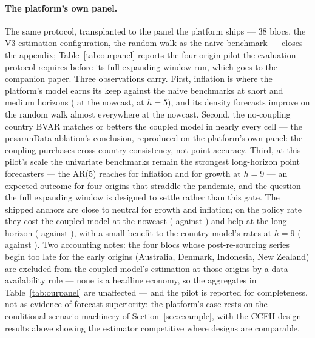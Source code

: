 \paragraph{The platform's own panel.} The same protocol, transplanted to the panel the
platform ships --- 38 blocs, the V3 estimation configuration, the random walk as the
naive benchmark --- closes the appendix; Table~\ref{tab:ourpanel} reports the four-origin
pilot the evaluation protocol requires before its full expanding-window run, which goes
to the companion paper. Three observations carry. First, inflation is where the
platform's model earns its keep against the naive benchmarks at short and medium
horizons (\OpGbvarIHOne{} at the nowcast, \OpGbvarIHFive{} at $h=5$), and its density
forecasts improve on the random walk almost everywhere at the nowcast. Second, the
no-coupling country BVAR matches or betters the coupled model in nearly every cell ---
the pesaranData ablation's conclusion, reproduced on the platform's own panel: the
coupling purchases cross-country consistency, not point accuracy. Third, at this pilot's
scale the univariate benchmarks remain the strongest long-horizon point forecasters ---
the AR(5) reaches \OpArFiveIHNine{} for inflation and \OpArFiveGHNine{} for growth at
$h=9$ --- an expected outcome for four origins that straddle the pandemic, and the
question the full expanding window is designed to settle rather than this gate. The
shipped anchors are close to neutral for growth and inflation; on the policy rate they
cost the coupled model at the nowcast (\OpAnchRHOne{} against \OpGbvarRHOne{}) and help
at the long horizon (\OpAnchRHNine{} against \OpGbvarRHNine{}), with a small benefit to
the country model's rates at $h=9$ (\OpSbvarAnchRHNine{} against \OpSbvarRHNine{}). Two
accounting notes: the four blocs whose post-re-sourcing series begin too late for the
early origins (Australia, Denmark, Indonesia, New Zealand) are excluded from the coupled
model's estimation at those origins by a data-availability rule --- none is a headline
economy, so the aggregates in Table~\ref{tab:ourpanel} are unaffected --- and the pilot
is reported for completeness, not as evidence of forecast superiority: the platform's
case rests on the conditional-scenario machinery of Section~\ref{sec:example}, with the
CCFH-design results above showing the estimator competitive where designs are
comparable.

